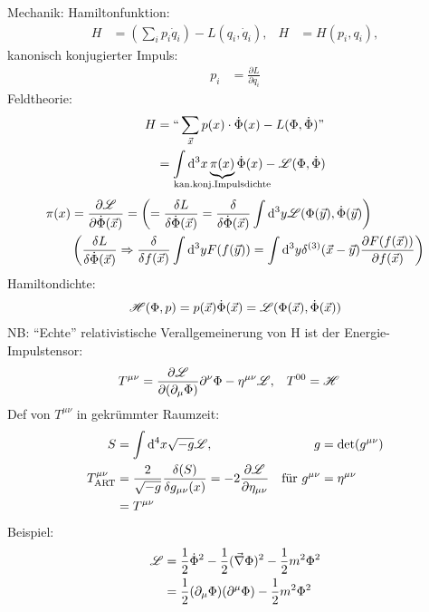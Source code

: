 	Mechanik: Hamiltonfunktion:
		\begin{align*}
			H &= (\sum_i p_i \dot{q}_i) - L (q_i, \dot{q}_i),& H&= H(p_i, q_i),
		\end{align*}
	kanonisch konjugierter Impuls:
		\begin{align*}
			p_i &= \frac{\partial L}{\partial q_i} 
		\end{align*}
	Feldtheorie:
		\begin{align*}
			H &= ``\sum_{\vec{x}} p(x) \cdot \dot{\Phi}(x) - L (\Phi, \dot{\Phi})\text{''} \\
			&= \int \diff^3 x \underbrace{\pi (x)}_{\mathclap{\text{kan.konj.Impulsdichte}}} \dot{\Phi}(x) - \La(\Phi, \dot{\Phi}) 
		\end{align*}
		\begin{align*}
			\pi(x) &= \frac{\partial \mathscr{L}}{\partial \dot{\Phi}(\vec{x})} = 
			\left(
				= \frac{\delta L}{\delta \dot{\Phi}(\vec{x})} = 
				\frac{\delta}{\delta \dot{\Phi}(\vec{x})}
				\int \mathrm{d}^3y \mathscr{L} (\Phi (\vec{y}), \dot{\Phi}(\vec{y})
			\right) \\
			&\left(
				\frac{\delta L}{\delta \dot{\Phi}(\vec{x})} \Rightarrow \frac{\delta}{\delta f(\vec{x})} \int \mathrm{d}^3y F(f(\vec{y})) = \int \mathrm{d}^3 y \delta^{(3)}(\vec{x}-\vec{y}) \frac{\partial F(f(\vec{x}))}{\partial f(\vec{x})}
			\right)
		\end{align*}
	Hamiltondichte:	
		\begin{align*}
			\mathscr{H} (\Phi, p) = p (\vec{x}) \dot{\Phi} (\vec{x}) = 
			\mathscr{L} (\Phi(\vec{x}), \dot{\Phi} (\vec{x}))
		\end{align*}
	NB: ``Echte'' relativistische Verallgemeinerung von H ist der Energie-Impulstensor:
		\begin{align*}
			T^{\mu \nu} &= \frac{\partial \mathscr{L}}{\partial(\partial_\mu \Phi)} \partial^{\nu} \Phi - \eta^{\mu \nu} \mathscr{L} ,& T^{00} &= \mathscr{H}
		\end{align*}
	Def von $T^{\mu \nu}$ in gekrümmter Raumzeit:
		\begin{align*}
			S &= \int \mathrm{d}^4 x \sqrt{-g} \mathscr{L}, & g&= \det (g^{\mu \nu}) \\
			T_{\text{ART}}^{\mu \nu} &= \frac{2}{\sqrt{-g}} \frac{\delta (S)}{\delta g_{\mu \nu}(x)} = -2 \frac{\partial \mathscr{L}}{\partial \eta_{\mu \nu}} &
			\text{für } g^{\mu \nu} &= \eta^{\mu \nu} \\
			&= T^{\mu \nu}
		\end{align*}
	Beispiel: 
		\begin{align*}
			\mathscr{L} &= \frac{1}{2} \dot{\Phi}^2 - \frac{1}{2} (\vec{\nabla} \Phi)^2 - \frac{1}{2} m^2 \Phi^2 \\
			&= \frac{1}{2} (\partial_\mu \Phi) (\partial^\mu \Phi) - \frac{1}{2}m^2 \Phi^2 
		\end{align*}
